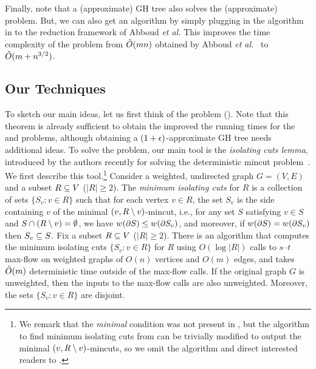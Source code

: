 Finally, note that a (approximate) GH tree also solves the (approximate) \apc problem. But, we can also get an \apc algorithm by simply plugging in the \ssc algorithm in  to the reduction framework of Abboud {\em et al.} This improves the time complexity of the \apc problem from $\tilde{O}(mn)$ obtained by  Abboud {\em et al.}~\cite{AbboudKT20b} to $\tilde{O}(m + n^{3/2})$.


\subsection{Our Techniques}

To sketch our main ideas, let us first think of the \ct problem (). Note that this theorem is already sufficient to obtain the improved the running times for the \ssc and \apc problems, although obtaining a $(1+\epsilon)$-approximate GH tree needs additional ideas. To solve the \ct problem, our main tool is the {\em isolating cuts lemma}, introduced by the authors recently for solving the deterministic mincut problem~\cite{LiP20}. We first describe this tool.\footnote{
We remark that the \emph{minimal} condition was not present in \cite{LiP20}, but the algorithm to find minimum isolating cuts from \cite{LiP20} can be trivially modified to output the minimal $(v,R\setminus v)$-mincuts, so we omit the algorithm and direct interested readers to \cite{LiP20}.}
%
Consider a weighted, undirected graph $G=(V,E)$ and a subset $R\subseteq V$ ($|R|\ge2$). The \emph{minimum isolating cuts} for $R$ is a collection of sets $\{S_v:v\in R\}$ such that for each vertex $v\in R$, the set $S_v$ is the side containing $v$ of the minimal $(v,R\setminus v)$-mincut, i.e., for any set $S$ satisfying $v\in S$ and $S\cap(R\setminus v)=\emptyset$, we have $w(\partial S)\le w(\partial S_v)$, and moreover, if $w(\partial S)=w(\partial S_v)$ then $S_v\subseteq S$.
\ED
%
%
Fix a subset $R\subseteq V$ ($|R|\ge2$). There is an algorithm that computes the minimum isolating cuts $\{S_v:v\in R\}$ for $R$ using $O(\log|R|)$ calls to $s$--$t$ max-flow on weighted graphs of $O(n)$ vertices and $O(m)$ edges, and takes $\tilde{O}(m)$ deterministic time outside of the max-flow calls. If the original graph $G$ is unweighted, then the inputs to the max-flow calls are also unweighted. Moreover, the sets $\{S_v:v\in R\}$ are disjoint.
